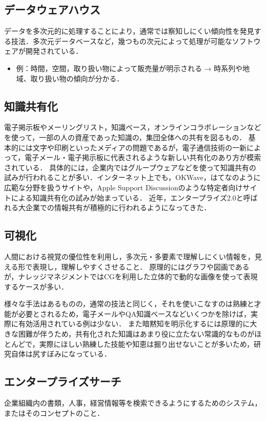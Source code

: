 \subsection{データウェアハウス}
データを多次元的に処理することにより，通常では察知しにくい傾向性を発見する技法．多次元データベースなど，幾つもの次元によって処理が可能なソフトウェアが開発されている．

\begin{itemize}
  \item 例：時間，空間，取り扱い物によって販売量が明示される → 時系列や地域、取り扱い物の傾向が分かる\cite{management}．
\end{itemize}

\subsection{知識共有化}
電子掲示板やメーリングリスト，知識ベース，オンラインコラボレーションなどを使って，一部の人の資産であった知識の，集団全体への共有を図るもの．
基本的には文字や印刷といったメディアの問題であるが，電子通信技術の一新によって，電子メール・電子掲示板に代表されるような新しい共有化のあり方が模索されている．
具体的には，企業内ではグループウェアなどを使って知識共有の試みが行われることが多い．インターネット上でも，OKWave，はてなのように広範な分野を扱うサイトや，Apple Support Discussionのような特定者向けサイトによる知識共有化の試みが始まっている．
近年，エンタープライズ2.0と呼ばれる大企業での情報共有が積極的に行われるようになってきた\cite{management}．


\subsection{可視化}
人間における視覚の優位性を利用し，多次元・多要素で理解しにくい情報を，見える形で表現し，理解しやすくさせること．
原理的にはグラフや図画であるが，ナレッジマネジメントではCGを利用した立体的で動的な画像を使って表現するケースが多い．


様々な手法はあるものの，通常の技法と同じく，それを使いこなすのは熟練と才能が必要とされるため，電子メールやQA知識ベースなどいくつかを除けば，実際に有効活用されている例は少ない．
また暗黙知を明示化するには原理的に大きな困難が伴うため，共有化された知識はあまり役に立たない常識的なものがほとんどで，実際にほしい熟練した技能や知恵は掘り出せないことが多いため，研究自体は尻すぼみになっている\cite{management}．

\subsection{エンタープライズサーチ}
企業組織内の書類，人事，経営情報等を検索できるようにするためのシステム，またはそのコンセプトのこと\cite{management}．


